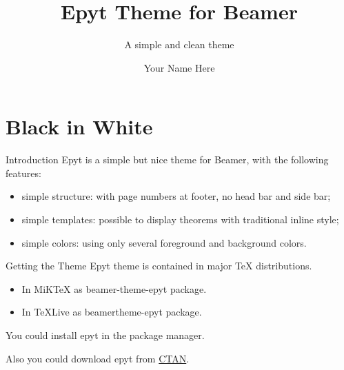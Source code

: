 \documentclass[12pt]{beamer}
\newcommand{\mylead}[1]{\textcolor{acolor1}{#1}}
\newcommand{\mybold}[1]{\textcolor{acolor2}{#1}}
\begin{document}
\title{Epyt Theme for Beamer}
\subtitle{A simple and clean theme}
\author{Your Name Here}

\begin{frame}[plain]\transboxout
\titlepage
\end{frame}


\section{Black in White}

\begin{frame}{Introduction}
\mylead{Epyt} is a simple but nice theme for Beamer, with the following features: \pause
\begin{itemize}[<+->]
\item simple structure: with page numbers at footer, no head bar and side bar;
\item simple templates: possible to display theorems with traditional inline style;
\item simple colors: using only several foreground and background colors.
\end{itemize}
\end{frame}

\begin{frame}{Getting the Theme}
\mylead{Epyt} theme is contained in major TeX distributions.
\begin{itemize}
  \item In MiKTeX as \mybold{beamer-theme-epyt} package.
  \item In TeXLive as \mybold{beamertheme-epyt} package.
\end{itemize}
You could install \mylead{epyt} in the package manager.\par\pause
Also you could download \mylead{epyt} from \href{https://www.ctan.org/pkg/beamertheme-epyt}{CTAN}.
\end{frame}

\end{document}
